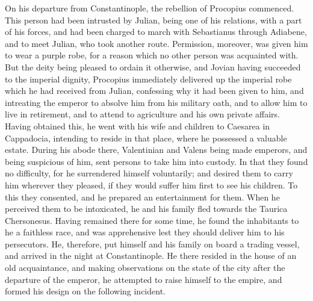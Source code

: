 On his departure from Constantinople, the rebellion of Procopius commenced. This person had been intrusted by Julian, being one of his relations, with a part of his forces, and had been charged to march with Sebastianus through Adiabene, and to meet Julian, who took another route. Permission, moreover, was given him to wear a purple robe, for a reason which no other person was acquainted with. But the deity being pleased to ordain it otherwise, and Jovian having succeeded to the imperial dignity, Procopius immediately delivered up the imperial robe which he had received from
Julian, confessing why it had been given to him, and intreating the emperor to absolve him from his military oath, and to allow him to live in retirement, and to attend to agriculture and his own private affairs. Having obtained this, he went with his wife and children to Caesarea in Cappadocia, intending to reside in that place, where he possessed a valuable estate. During his abode there, Valentinian and Valens being made emperors, and being suspicious of him, sent persons to take him into custody. In that they found no difficulty, for he surrendered himself voluntarily; and desired them to carry him wherever they pleased, if they would suffer him first to see his children. To this they consented, and he prepared an entertainment for them. When he perceived them to be intoxicated, he and his family fled towards the Taurica Chersonesus. Having remained there for some time, he found the inhabitants to he a faithless race, and was apprehensive lest they should deliver him to his persecutors. He, therefore, put himself and his family on board a trading vessel, and arrived in the night at Constantinople. He there resided in the house of an old acquaintance, and making observations on the state of the city after
the departure of the emperor, he attempted to raise himself to the empire, and formed his design on the following incident.

